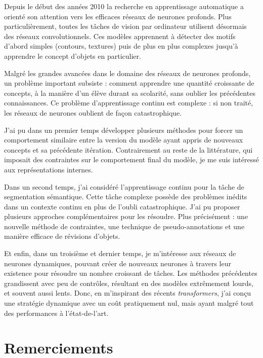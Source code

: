Depuis le début des années 2010 la recherche en apprentissage automatique a orienté son attention
vers les efficaces réseaux de neurones profonds. Plus particulièrement, toutes les tâches de vision
par ordinateur utilisent désormais des réseaux convolutionnels. Ces modèles apprennent à détecter
des motifs d'abord simples (contours, textures) puis de plus en plus complexes jusqu'à apprendre
le concept d'objets en particulier.

Malgré les grandes avancées dans le domaine des réseaux de neurones profonds, un problème important
subsiste : comment apprendre une quantité croissante de concepts, à la manière d'un élève durant sa
scolarité, sans oublier les précédentes connaissances. Ce problème d'apprentissage continu est
complexe : si non traité, les réseaux de neurones oublient de façon catastrophique.

J'ai pu dans un premier temps développer plusieurs méthodes pour forcer un comportement similaire
entre la version du modèle ayant appris de nouveaux concepts et sa précédente itération.
Contrairement au reste de la littérature, qui imposait des contraintes sur le comportement final du
modèle, je me suis intéressé aux représentations internes.

Dans un second temps, j'ai considéré l'apprentissage continu pour la tâche de segmentation
sémantique. Cette tâche complexe possède des problèmes inédits dans un contexte continu en plus de
l'oubli catastrophique. J'ai pu proposer plusieurs approches complémentaires pour les résoudre. Plus
précisément : une nouvelle méthode de contraintes, une technique de pseudo-annotations et une
manière efficace de révisions d'objets.

Et enfin, dans un troisième et dernier temps, je m'intéresse aux réseaux de neurones dynamiques,
pouvant créer de nouveaux neurones à travers leur existence pour résoudre un nombre croissant de
tâches. Les méthodes précédentes grandissent avec peu de contrôles, résultant en des modèles
extrêmement lourds, et souvent aussi lents. Donc, en m'inspirant des récents \textit{transformers},
j'ai conçu une stratégie dynamique avec un coût pratiquement nul, mais ayant malgré tout des
performances à l'état-de-l'art.


\cleardoublepage
\chapter{Remerciements}


